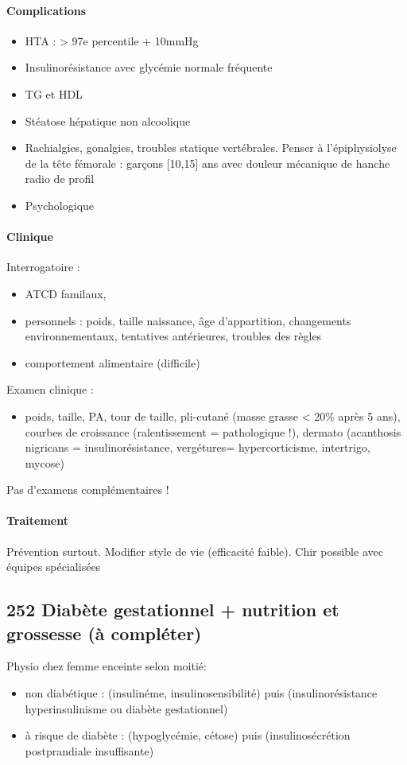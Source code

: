 \documentclass[11pt]{article}
\begin{document}
\paragraph{Complications}
\label{sec:org198271a}
\begin{itemize}
\item HTA : > 97e percentile + 10mmHg
\item Insulinorésistance avec glycémie normale fréquente
\item \inc TG et \dec HDL
\item Stéatose hépatique non alcoolique
\item Rachialgies, gonalgies, troubles statique vertébrales. Penser à l'épiphysiolyse
de la tête fémorale : garçons [10,15] ans avec douleur mécanique de hanche
\thus radio de profil
\item Psychologique
\end{itemize}

\paragraph{Clinique}
\label{sec:org596c5d4}
Interrogatoire : 
\begin{itemize}
\item ATCD familaux,
\item personnels : poids, taille naissance, âge d'appartition, changements environnementaux, tentatives antérieures, troubles des règles
\item comportement alimentaire (difficile)
\end{itemize}
Examen clinique :
\begin{itemize}
\item poids, taille, PA, tour de taille, pli-cutané (masse grasse < 20\% après 5 ans), courbes de
croissance (ralentissement = pathologique !), dermato (acanthosis nigricans =
insulinorésistance, vergétures= hypercorticisme, intertrigo, mycose)
\end{itemize}
Pas d'examens complémentaires !

\paragraph{Traitement}
\label{sec:org19ad848}
Prévention surtout. Modifier style de vie (efficacité faible). Chir possible
avec équipes spécialisées
\subsection{252 \textdagger{} Diabète gestationnel + nutrition et grossesse (à compléter)}
\label{sec:orgd07b208}
\label{orgf0d741f}
 Physio chez femme enceinte selon moitié:
\begin{itemize}
\item non diabétique : (\inc insulinéme, insulinosensibilité) puis (insulinorésistance
\thus hyperinsulinisme ou diabète gestationnel)
\item à risque de diabète : (hypoglycémie, cétose) puis (insulinosécrétion
postprandiale insuffisante)
\end{itemize}
\end{document}

